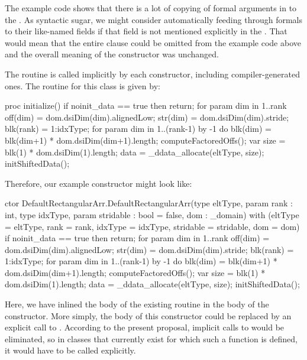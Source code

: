 \begin{openissue}

The example code shows that there is a lot of copying of formal arguments in to the
.  As syntactic sugar, we might consider automatically feeding
through formals to their like-named fields if that field is not mentioned explicitly in
the .  That would mean that the entire  clause could
be omitted from the example code above and the overall meaning of the constructor was
unchanged.
\end{openissue}

The  routine is called implicitly by each constructor, including
compiler-generated ones.
The  routine for this class is given by:
\begin{chapel}
    proc initialize() {
      if noinit_data == true then return;
      for param dim in 1..rank {
        off(dim) = dom.dsiDim(dim).alignedLow;
        str(dim) = dom.dsiDim(dim).stride;
      }
      blk(rank) = 1:idxType;
      for param dim in 1..(rank-1) by -1 do
        blk(dim) = blk(dim+1) * dom.dsiDim(dim+1).length;
      computeFactoredOffs();
      var size = blk(1) * dom.dsiDim(1).length;
      data = _ddata_allocate(eltType, size);
      initShiftedData();
    }
\end{chapel}

Therefore, our example constructor might look like:
\begin{chapel}
ctor DefaultRectangularArr.DefaultRectangularArr(type eltType,
                                                 param rank : int,
                                                 type idxType,
                                                 param stridable : bool = false,
                                                 dom : _domain)
  with (eltType = eltType, 
        rank = rank, 
        idxType = idxType, 
        stridable = stridable,
        dom = dom) {
    if noinit_data == true then return;
    for param dim in 1..rank {
      off(dim) = dom.dsiDim(dim).alignedLow;
      str(dim) = dom.dsiDim(dim).stride;
    }
    blk(rank) = 1:idxType;
    for param dim in 1..(rank-1) by -1 do
      blk(dim) = blk(dim+1) * dom.dsiDim(dim+1).length;
    computeFactoredOffs();
    var size = blk(1) * dom.dsiDim(1).length;
    data = _ddata_allocate(eltType, size);
    initShiftedData();
}
\end{chapel}
Here, we have inlined the body of the existing  routine in the body of
the constructor.
More simply, the body of this constructor could be replaced by an explicit call to
.  According to the present proposal, implicit calls to
 would be eliminated, so in classes that currently exist for which such
a function is defined, it would have to be called explicitly.

